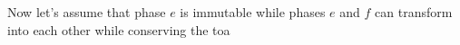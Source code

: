 Now let's assume that phase \(e\) is immutable while phases \(e\) and \(f\) can transform into each other while conserving the toa